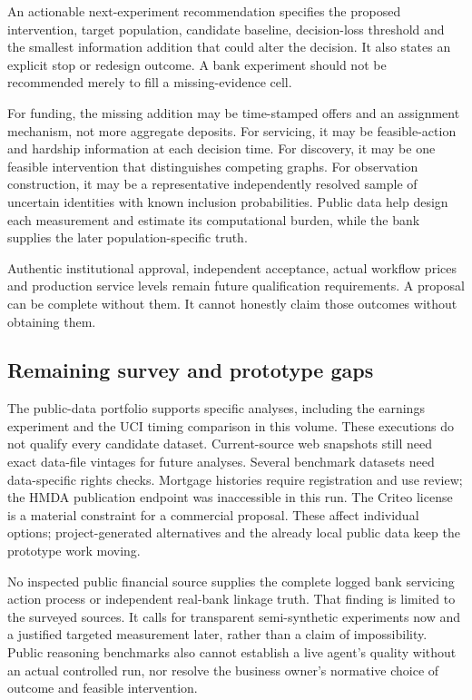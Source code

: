 An actionable next-experiment recommendation specifies the proposed
intervention, target population, candidate baseline, decision-loss
threshold and the smallest information addition that could alter the
decision. It also states an explicit stop or redesign outcome. A bank
experiment should not be recommended merely to fill a missing-evidence
cell.

For funding, the missing addition may be time-stamped offers and an
assignment mechanism, not more aggregate deposits. For servicing, it may
be feasible-action and hardship information at each decision time. For
discovery, it may be one feasible intervention that distinguishes
competing graphs. For observation construction, it may be a
representative independently resolved sample of uncertain identities
with known inclusion probabilities. Public data help design each
measurement and estimate its computational burden, while the bank
supplies the later population-specific truth.

Authentic institutional approval, independent acceptance, actual
workflow prices and production service levels remain future
qualification requirements. A proposal can be complete without them. It
cannot honestly claim those outcomes without obtaining them.

\hypertarget{remaining-survey-and-prototype-gaps}{%
\subsection{Remaining survey and prototype
gaps}\label{remaining-survey-and-prototype-gaps}}

The public-data portfolio supports specific analyses, including the
earnings experiment and the UCI timing comparison in this volume. These
executions do not qualify every candidate dataset. Current-source web
snapshots still need exact data-file vintages for future analyses.
Several benchmark datasets need data-specific rights checks. Mortgage
histories require registration and use review; the HMDA publication
endpoint was inaccessible in this run. The Criteo license is a material
constraint for a commercial proposal. These affect individual options;
project-generated alternatives and the already local public data keep
the prototype work moving.

No inspected public financial source supplies the complete logged bank
servicing action process or independent real-bank linkage truth. That
finding is limited to the surveyed sources. It calls for transparent
semi-synthetic experiments now and a justified targeted measurement
later, rather than a claim of impossibility. Public reasoning benchmarks
also cannot establish a live agent's quality without an actual
controlled run, nor resolve the business owner's normative choice of
outcome and feasible intervention.

